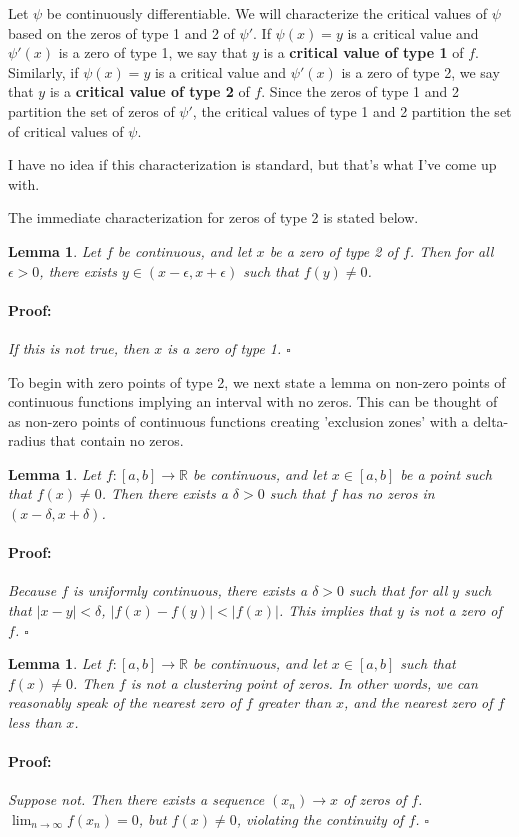 \documentclass{article}
\newenvironment{proof}{\paragraph{Proof:}}{\hfill$\square$}
\newtheorem{lemma}[theorem]{Lemma}
\newcommand{\R}{\mathbb{R}}
\begin{document}
Let $\psi$ be continuously differentiable. We will characterize the critical values of $\psi$ based on the zeros of type 1 and 2 of $\psi'$. If $\psi(x) = y$ is a critical value and $\psi'(x)$ is a zero of type 1, we say that $y$ is a \textbf{critical value of type 1} of $f$. Similarly, if $\psi(x) = y$ is a critical value and $\psi'(x)$ is a zero of type 2, we say that $y$ is a \textbf{critical value of type 2} of $f$. Since the zeros of type 1 and 2 partition the set of zeros of $\psi'$, the critical values of type 1 and 2 partition the set of critical values of $\psi$.

I have no idea if this characterization is standard, but that's what I've come up with.

The immediate characterization for zeros of type 2 is stated below.

\begin{lemma}
\label{ZeroType2ImpliesNonzeroPoint}
Let $f$ be continuous, and let $x$ be a zero of type 2 of $f$. Then for all $\epsilon > 0$, there exists $y \in (x-\epsilon, x + \epsilon)$ such that $f(y) \neq 0$.
\begin{proof}
If this is not true, then $x$ is a zero of type 1.
\end{proof} 
\end{lemma}

To begin with zero points of type 2, we next state a lemma on non-zero points of continuous functions implying an interval with no zeros. This can be thought of as non-zero points of continuous functions creating 'exclusion zones' with a delta-radius that contain no zeros.

\begin{lemma}
\label{ExclusionZoneDelta}
Let $f: [a, b] \rightarrow \R$ be continuous, and let $x \in [a, b]$ be a point such that $f(x) \neq 0$. Then there exists a $\delta > 0$ such that $f$ has no zeros in $(x-\delta, x+\delta)$.
\begin{proof}
Because $f$ is uniformly continuous, there exists a $\delta > 0$ such that for all $y$ such that $|x-y| < \delta$, $|f(x) - f(y)| < |f(x)|$. This implies that $y$ is not a zero of $f$.
\end{proof}
\end{lemma}

\begin{lemma}
\label{LemmaType2NotCluster}
Let $f: [a, b] \rightarrow \R$ be continuous, and let $x \in [a, b]$ such that $f(x) \neq 0$. Then $f$ is not a clustering point of zeros. In other words, we can reasonably speak of the nearest zero of $f$ greater than $x$, and the nearest zero of $f$ less than $x$.
\begin{proof}
Suppose not. Then there exists a sequence $(x_n) \rightarrow x$ of zeros of $f$. $\lim_{n \rightarrow \infty} f(x_n) = 0$, but $f(x) \neq 0$, violating the continuity of $f$.
\end{proof}
\end{lemma}
\end{document}
